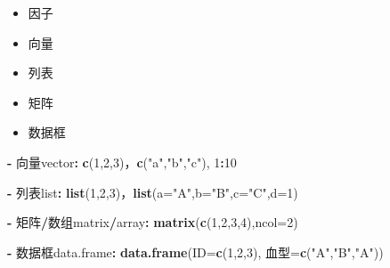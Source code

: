 \documentclass[]{book}
\newenvironment{Shaded}{\begin{snugshade}}{\end{snugshade}}
\newcommand{\DataTypeTok}[1]{\textcolor[rgb]{0.13,0.29,0.53}{#1}}
\newcommand{\DecValTok}[1]{\textcolor[rgb]{0.00,0.00,0.81}{#1}}
\newcommand{\KeywordTok}[1]{\textcolor[rgb]{0.13,0.29,0.53}{\textbf{#1}}}
\newcommand{\NormalTok}[1]{#1}
\newcommand{\OperatorTok}[1]{\textcolor[rgb]{0.81,0.36,0.00}{\textbf{#1}}}
\newcommand{\StringTok}[1]{\textcolor[rgb]{0.31,0.60,0.02}{#1}}
\providecommand{\tightlist}{%
  \setlength{\itemsep}{0pt}\setlength{\parskip}{0pt}}
\begin{document}
\begin{itemize}
\tightlist
\item
  因子
\item
  向量
\item
  列表
\item
  矩阵
\item
  数据框
\end{itemize}

\begin{Shaded}
\begin{Highlighting}[]
\OperatorTok{-}\StringTok{ }\NormalTok{向量vector}\OperatorTok{:}\StringTok{ }\KeywordTok{c}\NormalTok{(}\DecValTok{1}\NormalTok{,}\DecValTok{2}\NormalTok{,}\DecValTok{3}\NormalTok{)，}\KeywordTok{c}\NormalTok{(}\StringTok{"a"}\NormalTok{,}\StringTok{"b"}\NormalTok{,}\StringTok{"c"}\NormalTok{), }\DecValTok{1}\OperatorTok{:}\DecValTok{10}
\end{Highlighting}
\end{Shaded}

\begin{Shaded}
\begin{Highlighting}[]
\OperatorTok{-}\StringTok{ }\NormalTok{列表list}\OperatorTok{:}\StringTok{ }\KeywordTok{list}\NormalTok{(}\DecValTok{1}\NormalTok{,}\DecValTok{2}\NormalTok{,}\DecValTok{3}\NormalTok{)，}\KeywordTok{list}\NormalTok{(}\DataTypeTok{a=}\StringTok{"A"}\NormalTok{,}\DataTypeTok{b=}\StringTok{"B"}\NormalTok{,}\DataTypeTok{c=}\StringTok{"C"}\NormalTok{,}\DataTypeTok{d=}\DecValTok{1}\NormalTok{)}
\end{Highlighting}
\end{Shaded}

\begin{Shaded}
\begin{Highlighting}[]
\OperatorTok{-}\StringTok{ }\NormalTok{矩阵}\OperatorTok{/}\NormalTok{数组matrix}\OperatorTok{/}\NormalTok{array}\OperatorTok{:}\StringTok{ }\KeywordTok{matrix}\NormalTok{(}\KeywordTok{c}\NormalTok{(}\DecValTok{1}\NormalTok{,}\DecValTok{2}\NormalTok{,}\DecValTok{3}\NormalTok{,}\DecValTok{4}\NormalTok{),}\DataTypeTok{ncol=}\DecValTok{2}\NormalTok{)}
\end{Highlighting}
\end{Shaded}

\begin{Shaded}
\begin{Highlighting}[]
\OperatorTok{-}\StringTok{ }\NormalTok{数据框data.frame}\OperatorTok{:}\StringTok{ }\KeywordTok{data.frame}\NormalTok{(}\DataTypeTok{ID=}\KeywordTok{c}\NormalTok{(}\DecValTok{1}\NormalTok{,}\DecValTok{2}\NormalTok{,}\DecValTok{3}\NormalTok{), 血型=}\KeywordTok{c}\NormalTok{(}\StringTok{"A"}\NormalTok{,}\StringTok{"B"}\NormalTok{,}\StringTok{"A"}\NormalTok{))}
\end{Highlighting}
\end{Shaded}
\end{document}
